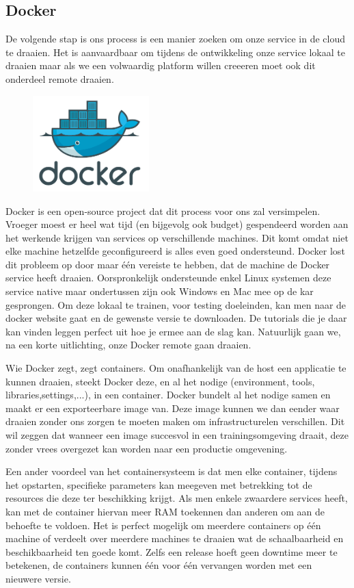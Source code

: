\documentclass{article}
\begin{document}
	\subsection{Docker}
	De volgende stap is ons process is een manier zoeken om onze service in de cloud te draaien. Het is aanvaardbaar om tijdens de ontwikkeling onze service lokaal te draaien maar als we een volwaardig platform willen creeeren moet ook dit onderdeel remote draaien.
	\par
	\begin{figure}
  	\includegraphics[width=0.4\textwidth]{images/docker-logo.PNG}
	\end{figure}
	
	Docker is een open-source project dat dit process voor ons zal versimpelen. Vroeger moest er heel wat tijd (en bijgevolg ook budget) gespendeerd worden aan het werkende krijgen van services op verschillende machines. Dit komt omdat niet elke machine hetzelfde geconfigureerd is alles even goed ondersteund. Docker lost dit probleem op door maar één vereiste te hebben, dat de machine de Docker service heeft draaien. Oorspronkelijk ondersteunde enkel Linux systemen deze service native maar ondertussen zijn ook Windows en Mac mee op de kar gesprongen. Om deze lokaal te trainen, voor testing doeleinden, kan men naar de docker website gaat en de gewenste versie te downloaden. De tutorials die je daar kan vinden leggen perfect uit hoe je ermee aan de slag kan. Natuurlijk gaan we, na een korte uitlichting, onze Docker remote gaan draaien.
	\par
	Wie Docker zegt, zegt containers. Om onafhankelijk van de host een applicatie te kunnen draaien, steekt Docker deze, en al het nodige (environment, tools, libraries,settings,...), in een container. Docker bundelt al het nodige samen en maakt er een exporteerbare image van. Deze image kunnen we dan eender waar draaien zonder ons zorgen te moeten maken om infrastructurelen verschillen. Dit wil zeggen dat wanneer een image succesvol in een trainingsomgeving draait, deze zonder vrees overgezet kan worden naar een productie omgevening.
	\par
	Een ander voordeel van het containersysteem is dat men elke container, tijdens het opstarten, specifieke parameters kan meegeven met betrekking tot de resources die deze ter beschikking krijgt. Als men enkele zwaardere services heeft, kan met de container hiervan meer RAM toekennen dan anderen om aan de behoefte te voldoen. Het is perfect mogelijk om meerdere containers op één machine of verdeelt over meerdere machines te draaien wat de schaalbaarheid en beschikbaarheid ten goede komt. Zelfs een release hoeft geen downtime meer te betekenen, de containers kunnen één voor één vervangen worden met een nieuwere versie.
\end{document}
